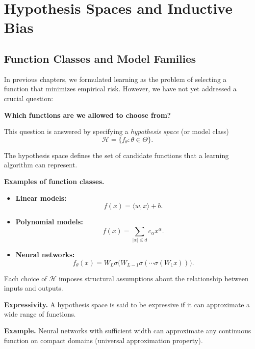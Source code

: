 
\chapter{Hypothesis Spaces and Inductive Bias}

\section{Function Classes and Model Families}

In previous chapters, we formulated learning as the problem of selecting a function that minimizes empirical risk. However, we have not yet addressed a crucial question:

\medskip

\noindent
\textbf{Which functions are we allowed to choose from?}

\medskip

This question is answered by specifying a \emph{hypothesis space} (or model class)
\[
\mathcal{H} = \{ f_\theta : \theta \in \Theta \}.
\]

\medskip

The hypothesis space defines the set of candidate functions that a learning algorithm can represent.

\medskip

\noindent
\textbf{Examples of function classes.}

\begin{itemize}
    \item \textbf{Linear models:}
    \[
    f(x) = \langle w, x \rangle + b.
    \]

    \item \textbf{Polynomial models:}
    \[
    f(x) = \sum_{|\alpha| \leq d} c_\alpha x^\alpha.
    \]

    \item \textbf{Neural networks:}
    \[
    f_\theta(x) = W_L \sigma\big(W_{L-1} \sigma(\cdots \sigma(W_1 x))\big).
    \]
\end{itemize}

\medskip

Each choice of $\mathcal{H}$ imposes structural assumptions about the relationship between inputs and outputs.

\medskip

\noindent
\textbf{Expressivity.}  
A hypothesis space is said to be expressive if it can approximate a wide range of functions.

\medskip

\noindent
\textbf{Example.}  
Neural networks with sufficient width can approximate any continuous function on compact domains (universal approximation property).

